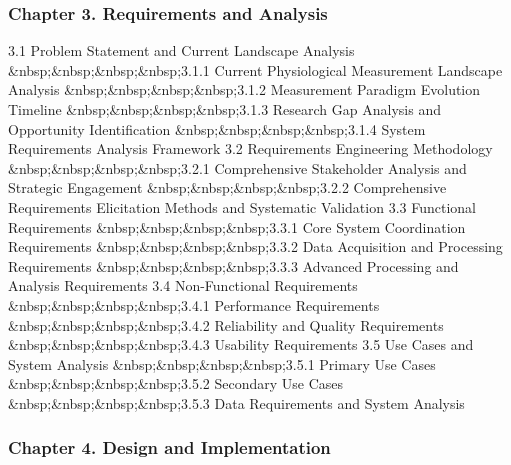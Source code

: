 \documentclass[12pt,a4paper]{report}
\begin{document}
\subsubsection{Chapter 3. Requirements and Analysis}

3.1 Problem Statement and Current Landscape Analysis  
\&nbsp;\&nbsp;\&nbsp;\&nbsp;3.1.1 Current Physiological Measurement Landscape Analysis  
\&nbsp;\&nbsp;\&nbsp;\&nbsp;3.1.2 Measurement Paradigm Evolution Timeline  
\&nbsp;\&nbsp;\&nbsp;\&nbsp;3.1.3 Research Gap Analysis and Opportunity Identification  
\&nbsp;\&nbsp;\&nbsp;\&nbsp;3.1.4 System Requirements Analysis Framework  
3.2 Requirements Engineering Methodology  
\&nbsp;\&nbsp;\&nbsp;\&nbsp;3.2.1 Comprehensive Stakeholder Analysis and Strategic Engagement  
\&nbsp;\&nbsp;\&nbsp;\&nbsp;3.2.2 Comprehensive Requirements Elicitation Methods and Systematic Validation  
3.3 Functional Requirements  
\&nbsp;\&nbsp;\&nbsp;\&nbsp;3.3.1 Core System Coordination Requirements  
\&nbsp;\&nbsp;\&nbsp;\&nbsp;3.3.2 Data Acquisition and Processing Requirements  
\&nbsp;\&nbsp;\&nbsp;\&nbsp;3.3.3 Advanced Processing and Analysis Requirements  
3.4 Non-Functional Requirements  
\&nbsp;\&nbsp;\&nbsp;\&nbsp;3.4.1 Performance Requirements  
\&nbsp;\&nbsp;\&nbsp;\&nbsp;3.4.2 Reliability and Quality Requirements  
\&nbsp;\&nbsp;\&nbsp;\&nbsp;3.4.3 Usability Requirements  
3.5 Use Cases and System Analysis  
\&nbsp;\&nbsp;\&nbsp;\&nbsp;3.5.1 Primary Use Cases  
\&nbsp;\&nbsp;\&nbsp;\&nbsp;3.5.2 Secondary Use Cases  
\&nbsp;\&nbsp;\&nbsp;\&nbsp;3.5.3 Data Requirements and System Analysis

\subsubsection{Chapter 4. Design and Implementation}
\end{document}
